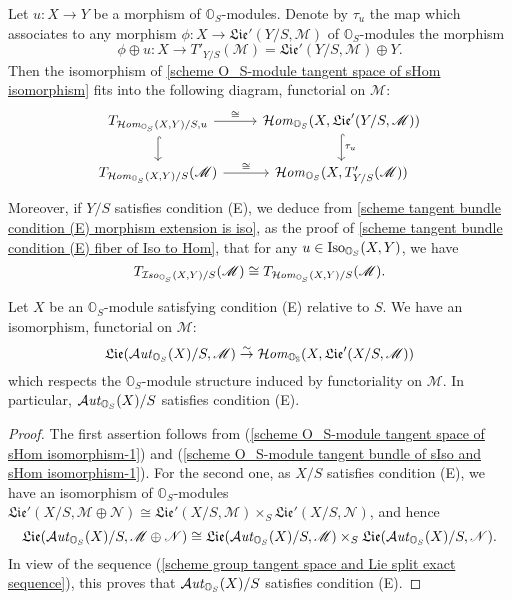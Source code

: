 \begin{remark}\label{scheme O_S-module tangent bundle of sIso and sHom isomorphism}
Let $u:X\to Y$ be a morphism of $\mathbb{O}_S$-modules. Denote by $\tau_u$ the map which associates to any morphism $\phi:X\to\mathfrak{Lie}'(Y/S,\mathscr{M})$ of $\mathbb{O}_S$-modules the morphism
\[\phi\oplus u:X\to T'_{Y/S}(\mathscr{M})=\mathfrak{Lie}'(Y/S,\mathscr{M})\oplus Y.\]
Then the isomorphism of \cref{scheme O_S-module tangent space of sHom isomorphism} fits into the following diagram, functorial on $\mathscr{M}$:
\begin{equation}\label{scheme O_S-module tangent bundle of sIso and sHom isomorphism-1}
\begin{tikzcd}
T_{\sHom_{\mathbb{O}_S}(X,Y)/S,u}\ar[r,"\cong"]\ar[d,hook]&\sHom_{\mathbb{O}_S}(X,\mathfrak{Lie}'(Y/S,\mathscr{M}))\ar[d,hook,"\tau_u"]\\
T_{\sHom_{\mathbb{O}_S}(X,Y)/S}(\mathscr{M})\ar[r,"\cong"]&\sHom_{\mathbb{O}_S}(X,T'_{Y/S}(\mathscr{M}))
\end{tikzcd}
\end{equation}
Moreover, if $Y/S$ satisfies condition (E), we deduce from \cref{scheme tangent bundle condition (E) morphism extension is iso}, as the proof of \cref{scheme tangent bundle condition (E) fiber of Iso to Hom}, that for any $u\in\mathrm{Iso}_{\mathbb{O}_S}(X,Y)$, we have
\begin{equation}\label{scheme O_S-module tangent bundle of sIso and sHom isomorphism-1}
T_{\operatorname{\mathcal{I}\hspace*{-0.5pt}\textit{so}\hspace{0.5pt}}_{\mathbb{O}_S}(X,Y)/S}(\mathscr{M})\cong T_{\operatorname{\mathcal{H}\hspace*{-0.4pt}\textit{om}\hspace{0.5pt}}_{\mathbb{O}_S}(X,Y)/S}(\mathscr{M}).
\end{equation}
\end{remark}

\begin{corollary}\label{scheme O_S-module condition (E) Lie of sAut isomorphism}
Let $X$ be an $\mathbb{O}_S$-module satisfying condition (E) relative to $S$. We have an isomorphism, functorial on $\mathscr{M}$:
\[\mathfrak{Lie}(\operatorname{\mathcal{A}\hspace*{-0.2pt}\textit{ut}\hspace{0.5pt}}_{\mathbb{O}_S}(X)/S,\mathscr{M})\stackrel{\sim}{\to} \operatorname{\mathcal{H}\hspace*{-0.4pt}\textit{om}\hspace{0.5pt}}_{\mathbb{O_S}}(X,\mathfrak{Lie}'(X/S,\mathscr{M}))\]
which respects the $\mathbb{O}_S$-module structure induced by functoriality on $\mathscr{M}$. In particular, $\operatorname{\mathcal{A}\hspace*{-0.2pt}\textit{ut}\hspace{0.5pt}}_{\mathbb{O}_S}(X)/S$ satisfies condition (E).
\end{corollary}
\begin{proof}
The first assertion follows from (\ref{scheme O_S-module tangent space of sHom isomorphism-1}) and (\ref{scheme O_S-module tangent bundle of sIso and sHom isomorphism-1}). For the second one, as $X/S$ satisfies condition (E), we have an isomorphism of $\mathbb{O}_S$-modules $\mathfrak{Lie}'(X/S,\mathscr{M}\oplus\mathscr{N})\cong \mathfrak{Lie}'(X/S,\mathscr{M})\times_S\mathfrak{Lie}'(X/S,\mathscr{N})$, and hence
\[\mathfrak{Lie}(\operatorname{\mathcal{A}\hspace*{-0.2pt}\textit{ut}\hspace{0.5pt}}_{\mathbb{O}_S}(X)/S,\mathscr{M}\oplus\mathscr{N})\cong\mathfrak{Lie}(\operatorname{\mathcal{A}\hspace*{-0.2pt}\textit{ut}\hspace{0.5pt}}_{\mathbb{O}_S}(X)/S,\mathscr{M})\times_S\mathfrak{Lie}(\operatorname{\mathcal{A}\hspace*{-0.2pt}\textit{ut}\hspace{0.5pt}}_{\mathbb{O}_S}(X)/S,\mathscr{N}).\]
In view of the sequence (\ref{scheme group tangent space and Lie split exact sequence}), this proves that $\operatorname{\mathcal{A}\hspace*{-0.2pt}\textit{ut}\hspace{0.5pt}}_{\mathbb{O}_S}(X)/S$ satisfies condition (E).
\end{proof}

